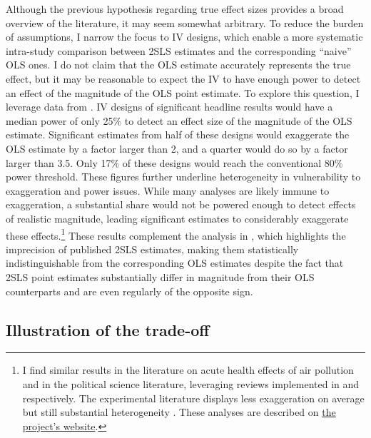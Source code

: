 \documentclass[usletter, 12pt]{article}
\begin{document}
			Although the previous hypothesis regarding true effect sizes provides a broad overview of the literature, it may seem somewhat arbitrary. To reduce the burden of assumptions, I narrow the focus to IV designs, which enable a more systematic intra-study comparison between 2SLS estimates and the corresponding ``naive'' OLS ones. I do not claim that the OLS estimate accurately represents the true effect, but it may be reasonable to expect the IV to have enough power to detect an effect of the magnitude of the OLS point estimate. To explore this question, I leverage data from \cite{young_consistency_2022}. IV designs of significant headline results would have a median power of only 25\% to detect an effect size of the magnitude of the OLS estimate. Significant estimates from half of these designs would exaggerate the OLS estimate by a factor larger than 2, and a quarter would do so by a factor larger than 3.5. Only 17\% of these designs would reach the conventional 80\% power threshold. These figures further underline heterogeneity in vulnerability to exaggeration and power issues. While many analyses are likely immune to exaggeration, a substantial share would not be powered enough to detect effects of realistic magnitude, leading significant estimates to considerably exaggerate these effects.\footnote{I find similar results in the literature on acute health effects of air pollution and in the political science literature, leveraging reviews implemented in \cite{bagilet_accurate_2023} and \cite{lalHow2024} respectively. The experimental literature displays less exaggeration on average but still substantial heterogeneity \citep{camerer_evaluating_2016}. These analyses are described on \href{https://vincentbagilet.github.io/causal_exaggeration/lit_IVs.html}{the project's website}.} These results complement the analysis in \cite{young_consistency_2022}, which highlights the imprecision of published 2SLS estimates, making them statistically indistinguishable from the corresponding OLS estimates despite the fact that 2SLS point estimates substantially differ in magnitude from their OLS counterparts and are even regularly of the opposite sign. %
			
	\subsection{Illustration of the trade-off}
	
\end{document}
